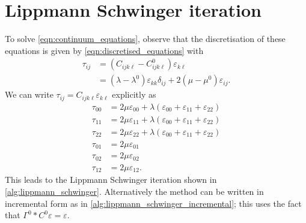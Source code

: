 \documentclass[11pt]{article}
\begin{document}
\section{Lippmann Schwinger iteration}
To solve \eqref{eqn:continuum_equations}, observe that the discretisation of these equations is given by \eqref{eqn:discretised_equations} with
\begin{equation}
    \begin{aligned}
    \tau_{ij} &= (C_{ijk\ell} - C^0_{ijk\ell}) \varepsilon_{k\ell} \\
    &= (\lambda-\lambda^0) \varepsilon_{kk} \delta_{ij} + 2(\mu-\mu^0)\varepsilon_{ij}.
    \end{aligned}
\end{equation}
We can write $\tau_{ij} = C_{ijk\ell}  \varepsilon_{k\ell}$ explicitly as
\begin{equation}
\begin{aligned}
\tau_{00} &= 2\mu\varepsilon_{00} + \lambda\left(\varepsilon_{00}+\varepsilon_{11}+\varepsilon_{22}\right) \\
\tau_{11} &= 2\mu\varepsilon_{11} + \lambda\left(\varepsilon_{00}+\varepsilon_{11}+\varepsilon_{22}\right)\\
\tau_{22} &= 2\mu\varepsilon_{22} + \lambda\left(\varepsilon_{00}+\varepsilon_{11}+\varepsilon_{22}\right)\\
\tau_{01} &= 2\mu\varepsilon_{01}\\
\tau_{02} &= 2\mu\varepsilon_{02}\\
\tau_{12} &= 2\mu\varepsilon_{12}.
\end{aligned}\label{eqn:tau_computation}
\end{equation}
This leads to the Lippmann Schwinger iteration shown in \cref{alg:lippmann_schwinger}. Alternatively the method can be written in incremental form as in \cref{alg:lippmann_schwinger_incremental}; this uses the fact that $\Gamma^0*C^0 \varepsilon=\varepsilon$.
\begin{algorithm}
    \caption{Lippmann Schwinger iteration: simplest formulation}
    \label{alg:lippmann_schwinger}
\begin{algorithmic}[1]
    \EndFor
\State{\Return $\varepsilon$}
\end{algorithmic}
\end{algorithm}
\end{document}
